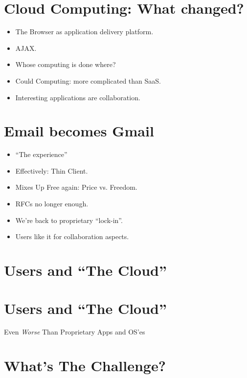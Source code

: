 \documentclass{article}
\begin{document}
\section{Cloud Computing: What changed?}

\begin{itemize}
\item 
  The Browser as application delivery platform.

\item 
  AJAX.

\item 
  Whose computing is done where?

\item 
  Could Computing: more complicated than SaaS.

\item 
  Interesting applications are collaboration.

\end{itemize}
\section{Email becomes Gmail}

\begin{itemize}
\item 
  ``The experience''

\item 
  Effectively: Thin Client.

\item 
  Mixes Up Free again: Price vs. Freedom.

\item 
  RFCs no longer enough.

\item 
  We're back to proprietary ``lock-in''.

\item 
  Users like it for collaboration aspects.

\end{itemize}
\section{Users and “The Cloud”}

\section{Users and “The Cloud”}

Even \emph{Worse} Than Proprietary Apps and OS'es
\section{What's The Challenge?}
\end{document}
